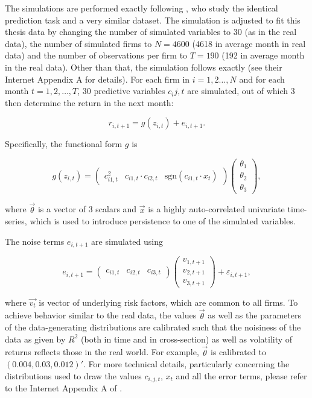 		The simulations are performed exactly following \cite{gu2020empirical}, who study the identical prediction task and a very similar dataset. The simulation is adjusted to fit this thesis data by changing the number of simulated variables to 30 (as in the real data), the number of simulated firms to $N=4600$ (4618 in average month in real data) and the number of observations per firm to  $T=190$ (192 in average month in the real data). Other than that, the simulation follows exactly \cite{gu2020empirical} (see their Internet Appendix A for details). For each firm in $i=1, 2\dots,N$ and for each month $t=1, 2, \dots,T$, 30 predictive variables $c_ij,t$ are simulated, out of which 3 then determine the return in the next month:
		
		\begin{equation*}
			r_{i,{t+1}} = g(z_{i,t}) + e_{i,t+1}.
		\end{equation*}
		
		Specifically, the functional form $g$ is 
		
		\begin{equation*}
			g(z_{i,t}) = \begin{pmatrix}
			c_{i1,t}^2 & c_{i1,t}\cdot c_{i2,t} & \text{sgn}(c_{i1,t}\cdot x_t)
			\end{pmatrix} \begin{pmatrix}
			\theta_1 \\ \theta_2 \\ \theta_3
			\end{pmatrix}, 
		\end{equation*}
		
		where $\vec{\theta}$ is a vector of 3 scalars and $\vec{x}$ is a highly auto-correlated univariate time-series, which is used to introduce persistence to one of the simulated variables.   
		
		The noise terms $e_{i,t+1}$ are simulated using 
		
		\begin{equation*}
			e_{i,t+1} = \begin{pmatrix} c_{i1,t} & c_{i2,t} & c_{i3,t} \end{pmatrix} \begin{pmatrix} v_{1,t+1} \\ v_{2,t+1} \\ v_{3,t+1}  \end{pmatrix} + \varepsilon_{i,t+1},
		\end{equation*}  
		
		where $\vec{v_t}$ is vector of underlying risk factors, which are common to all firms. To achieve behavior similar to the real data, the values $\vec{\theta}$ as well as the parameters of the data-generating distributions are calibrated such that the noisiness of the data as given by $R^2$ (both in time and in cross-section) as well as volatility of returns reflects those in the real world. For example, $\vec{\theta}$ is calibrated to $(0.004, 0.03, 0.012)'$. For more technical details, particularly concerning the distributions used to draw the values $c_{i,j,t}$, $x_t$  and all the error terms, please refer to the Internet Appendix A of \cite{gu2020empirical}. 
		
		\cite{baehrens2010explain}  \cite{elgers2001delayed}
		  
	
	
	
	
	
	
	
	
	
	
	
	
	
	
